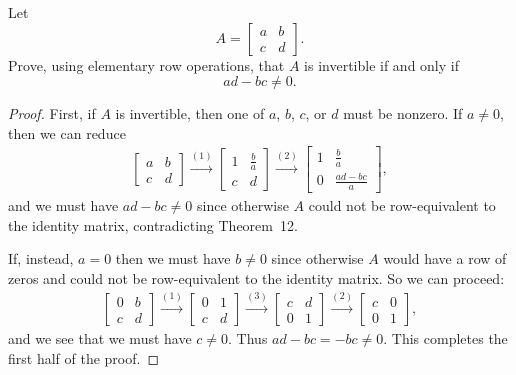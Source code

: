 \label{exercise:lin-eq:2-by-2-inv-crit}
Let
\begin{equation*}
  A =
  \begin{bmatrix}
    a & b \\
    c & d
  \end{bmatrix}.
\end{equation*}
Prove, using elementary row operations, that $A$ is invertible if and
only if
\begin{equation*}
  ad - bc \neq 0.
\end{equation*}
\begin{proof}
  First, if $A$ is invertible, then one of $a$, $b$, $c$, or $d$ must
  be nonzero. If $a\neq0$, then we can reduce
  \begin{gather*}
    \begin{bmatrix}
      a & b \\
      c & d
    \end{bmatrix}
    \xrightarrow{(1)}
    \begin{bmatrix}
      1 & \frac{b}a \\[3pt]
      c & d
    \end{bmatrix}
    \xrightarrow{(2)}
    \begin{bmatrix}
      1 & \frac{b}a \\[3pt]
      0 & \frac{ad-bc}a
    \end{bmatrix},
  \end{gather*}
  and we must have $ad - bc\neq0$ since otherwise $A$ could not be
  row-equivalent to the identity matrix, contradicting Theorem~12.

  If, instead, $a = 0$ then we must have $b\neq0$ since otherwise $A$
  would have a row of zeros and could not be row-equivalent to the
  identity matrix. So we can proceed:
  \begin{gather*}
    \begin{bmatrix}
      0 & b \\
      c & d
    \end{bmatrix}
    \xrightarrow{(1)}
    \begin{bmatrix}
      0 & 1 \\
      c & d
    \end{bmatrix}
    \xrightarrow{(3)}
    \begin{bmatrix}
      c & d \\
      0 & 1
    \end{bmatrix}
    \xrightarrow{(2)}
    \begin{bmatrix}
      c & 0 \\
      0 & 1
    \end{bmatrix},
  \end{gather*}
  and we see that we must have $c\neq0$. Thus $ad - bc =
  -bc\neq0$. This completes the first half of the proof.


\end{proof}
